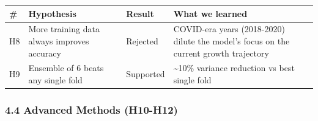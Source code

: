 {\def\LTcaptype{none} %
\begin{longtable}[]{@{}
  >{\raggedright\arraybackslash}p{}
  >{\raggedright\arraybackslash}p{}
  >{\raggedright\arraybackslash}p{}
  >{\raggedright\arraybackslash}p{}@{}}
\toprule\noalign{}
\begin{minipage}[b]{\linewidth}\raggedright
\#
\end{minipage} & \begin{minipage}[b]{\linewidth}\raggedright
Hypothesis
\end{minipage} & \begin{minipage}[b]{\linewidth}\raggedright
Result
\end{minipage} & \begin{minipage}[b]{\linewidth}\raggedright
What we learned
\end{minipage} \\
\midrule\noalign{}
\endhead
\bottomrule\noalign{}
\endlastfoot
H8 & More training data always improves accuracy & Rejected & COVID-era
years (2018-2020) dilute the model's focus on the current growth
trajectory \\
H9 & Ensemble of 6 beats any single fold & Supported &
\textasciitilde10\% variance reduction vs best single fold \\
\end{longtable}
}

\subsubsection{4.4 Advanced Methods
(H10-H12)}\label{advanced-methods-h10-h12}

